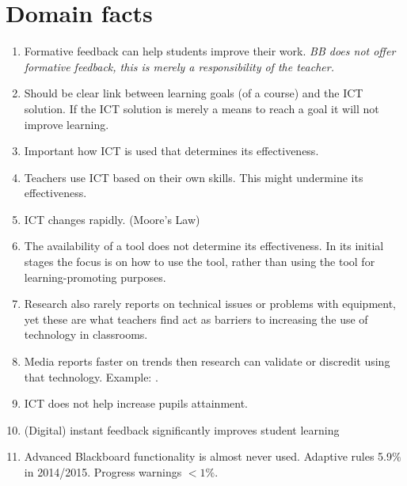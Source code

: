 \section{Domain facts}
\begin{enumerate}                                                           
	\item Formative feedback can help students improve their work.\cite{ict_study} \textit{BB does not offer formative feedback, this is merely a responsibility of the teacher.}
	\item Should be clear link between learning goals (of a course) and the ICT solution. If the ICT solution is merely a means to reach a goal it will not improve learning. \cite{ict_study}
	\item Important how ICT is used that determines its effectiveness.\cite{ict_study} 
	\item Teachers use ICT based on their own skills. This might undermine its effectiveness.\cite{ict_study} 
	\item ICT changes rapidly. (Moore's Law)
	\item The availability of a tool does not determine its effectiveness. In its initial stages the focus is on how to use the tool, rather than using the tool for learning-promoting purposes. \cite{ict_study}
	\item Research also rarely reports on technical issues or problems with equipment, yet these are what teachers find act as barriers to increasing the use of technology in classrooms.\cite{ict_study} 
	\item Media reports faster on trends then research can validate or discredit using that technology.\cite{ict_study} Example: . 
	\item ICT does not help increase pupils attainment.\cite{ict_study}
	\item (Digital) instant feedback significantly improves student learning \cite{clicker}
	\item Advanced Blackboard functionality is almost never used. Adaptive rules 5.9$\%$ in 2014/2015. Progress warnings $< 1 \%$. \cite{richard_report}
\end{enumerate}


